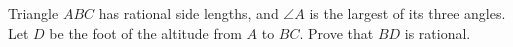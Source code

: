 Triangle $ABC$ has rational side lengths, and $\angle A$ is the largest of its three angles. Let $D$ be the foot of the altitude from $A$ to $BC$. Prove that $BD$ is rational.

